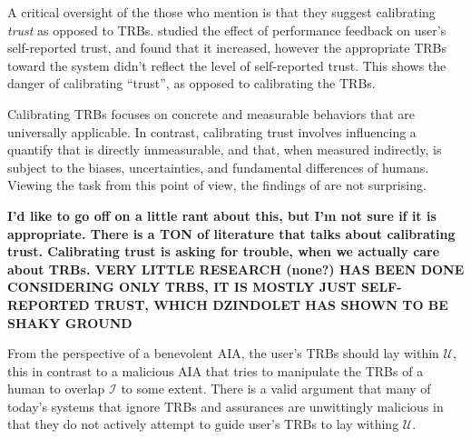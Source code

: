     A critical oversight of the those who mention is that they suggest calibrating \emph{trust} as opposed to TRBs. \citet{Dzindolet2003-ts} studied the effect of performance feedback on user's self-reported trust, and found that it increased, however the appropriate TRBs toward the system didn't reflect the level of self-reported trust. This shows the danger of calibrating ``trust'', as opposed to calibrating the TRBs.

    Calibrating TRBs focuses on concrete and measurable behaviors that are universally applicable. In contrast, calibrating trust involves influencing a quantify that is directly immeasurable, and that, when measured indirectly, is subject to the biases, uncertainties, and fundamental differences of humans. Viewing the task from this point of view, the findings of \citeauthor{Dzindolet2003-ts} are not surprising.

    \textbf{I'd like to go off on a little rant about this, but I'm not sure if it is appropriate. There is a TON of literature that talks about calibrating trust. Calibrating trust is asking for trouble, when we actually care about TRBs. VERY LITTLE RESEARCH  (none?) HAS BEEN DONE CONSIDERING ONLY TRBS, IT IS MOSTLY JUST SELF-REPORTED TRUST, WHICH DZINDOLET HAS SHOWN TO BE SHAKY GROUND}

    From the perspective of a benevolent AIA, the user's TRBs should lay within $\mathcal{U}$, this in contrast to a malicious AIA that tries to manipulate the TRBs of a human to overlap $\mathcal{I}$ to some extent. There is a valid argument that many of today's systems that ignore TRBs and assurances are unwittingly malicious in that they do not actively attempt to guide user's TRBs to lay withing $\mathcal{U}$.


